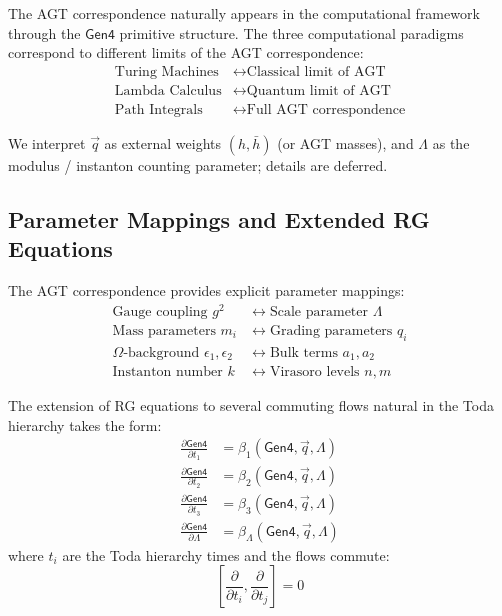 \begin{theorem}
\label{thm:agt-computational-g6}
The AGT correspondence naturally appears in the computational framework through the $\mathsf{Gen4}$ primitive structure. The three computational paradigms correspond to different limits of the AGT correspondence:
\begin{align}
\text{Turing Machines} &\leftrightarrow \text{Classical limit of AGT} \\
\text{Lambda Calculus} &\leftrightarrow \text{Quantum limit of AGT} \\
\text{Path Integrals} &\leftrightarrow \text{Full AGT correspondence}
\end{align}

We interpret $\vec{q}$ as external weights $(h,\bar{h})$ (or AGT masses), and $\Lambda$ as the modulus / instanton counting parameter; details are deferred.
\end{theorem}

\subsection{Parameter Mappings and Extended RG Equations}

\begin{definition}
\label{def:agt-parameters}
The AGT correspondence provides explicit parameter mappings:
\begin{align}
\text{Gauge coupling } g^2 &\leftrightarrow \text{Scale parameter } \Lambda \\
\text{Mass parameters } m_i &\leftrightarrow \text{Grading parameters } q_i \\
\text{$\Omega$-background } \epsilon_1, \epsilon_2 &\leftrightarrow \text{Bulk terms } a_1, a_2 \\
\text{Instanton number } k &\leftrightarrow \text{Virasoro levels } n, m
\end{align}
\end{definition}

\begin{definition}
\label{def:extended-rg-g6}
The extension of RG equations to several commuting flows natural in the Toda hierarchy takes the form:
\begin{align}
\frac{\partial \mathsf{Gen4}}{\partial t_1} &= \beta_1(\mathsf{Gen4}, \vec{q}, \Lambda) \\
\frac{\partial \mathsf{Gen4}}{\partial t_2} &= \beta_2(\mathsf{Gen4}, \vec{q}, \Lambda) \\
\frac{\partial \mathsf{Gen4}}{\partial t_3} &= \beta_3(\mathsf{Gen4}, \vec{q}, \Lambda) \\
\frac{\partial \mathsf{Gen4}}{\partial \Lambda} &= \beta_\Lambda(\mathsf{Gen4}, \vec{q}, \Lambda)
\end{align}
where $t_i$ are the Toda hierarchy times and the flows commute:
\[
[\frac{\partial}{\partial t_i}, \frac{\partial}{\partial t_j}] = 0
\]
\end{definition}

